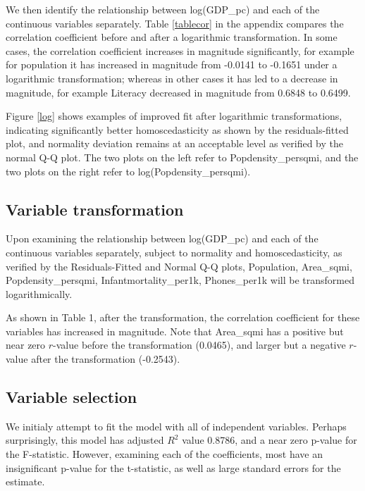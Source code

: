 \documentclass[12pt,a4paper]{article}
\renewcommand\texttt[1]{{\ttfamily\color{ttcolor}#1}}
\begin{document}
\pagebreak
We then identify the relationship between \texttt{log(GDP\_pc)} and each of the continuous variables separately. Table \ref{tablecor} in the appendix compares the correlation coefficient before and after a logarithmic transformation. In some cases, the correlation coefficient increases in magnitude significantly, for example for \texttt{population} it has increased in magnitude from -0.0141 to  -0.1651 under a logarithmic transformation; whereas in other cases it has led to a decrease in magnitude, for example \texttt{Literacy} decreased in magnitude from 0.6848 to 0.6499. 

Figure \ref{log} shows examples of improved fit after logarithmic transformations, indicating significantly better homoscedasticity as shown by the residuals-fitted plot, and normality deviation remains at an acceptable level as verified by the normal Q-Q plot. The two plots on the left refer to \texttt{Popdensity\_persqmi}, and the two plots on the right refer to \texttt{log(Popdensity\_persqmi)}. 

\subsection{Variable transformation}
Upon examining the relationship between \texttt{log(GDP\_pc)} and each of the continuous variables separately, subject to normality and homoscedasticity, as verified by the Residuals-Fitted and Normal Q-Q plots, \texttt{Population}, \texttt{Area\_sqmi}, \texttt{Popdensity\_persqmi}, \texttt{Infantmortality\_per1k}, \texttt{Phones\_per1k} will be transformed logarithmically.
 
As shown in Table 1, after the transformation, the correlation coefficient for these variables has increased in magnitude. Note that \texttt{Area\_sqmi} has a positive but near zero $r$-value before the transformation (0.0465), and larger but a negative $r$-value after the transformation (-0.2543). 

\subsection{Variable selection}
We initialy attempt to fit the model with all of independent variables. Perhaps surprisingly, this model has adjusted $R^2$ value 0.8786, and a near zero p-value for the F-statistic. However, examining each of the coefficients, most have an insignificant p-value for the t-statistic, as well as large standard errors for the estimate. 
\end{document}
